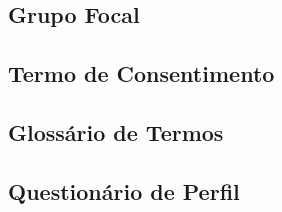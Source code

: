 \begin{apendicesenv}

\partapendices



\chapter{Grupo Focal} \label{ap:GRUPOFOCAL}

\section{Termo de Consentimento} \label{ap:TermoGP}
    \begin{figure}
        \centering
         
    \end{figure}
\newpage
\section{Glossário de Termos} \label{ap:GlossarioGP}
    \begin{figure}
        \centering
         
    \end{figure}
\newpage
\section{Questionário de Perfil} \label{ap:QuestPerfilGP}
    \begin{figure}
        \centering
         
    \end{figure}
\newpage

\end{apendicesenv}

